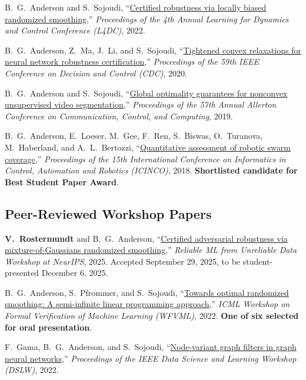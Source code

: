 \begin{enumerate}[label={[\arabic*]}]
	\item B.\ G.\ Anderson and S.\ Sojoudi, ``\href{https://brendon-anderson.github.io/files/publications/anderson2022certified-long.pdf}{Certified robustness via locally biased randomized smoothing},'' \textit{Proceedings of the 4th Annual Learning for Dynamics and Control Conference (L4DC)}, 2022.
	\item B.\ G.\ Anderson, Z.\ Ma, J.\ Li, and S.\ Sojoudi, ``\href{https://arxiv.org/pdf/2004.00570.pdf}{Tightened convex relaxations for neural network robustness certification},'' \textit{Proceedings of the 59th IEEE Conference on Decision and Control (CDC)}, 2020.
	\item B.\ G.\ Anderson and S.\ Sojoudi, ``\href{https://arxiv.org/pdf/1907.04409.pdf}{Global optimality guarantees for nonconvex unsupervised video segmentation},'' \textit{Proceedings of the 57th Annual Allerton Conference on Communication, Control, and Computing}, 2019.
	\item B.\ G.\ Anderson, E.\ Loeser, M.\ Gee, F.\ Ren, S.\ Biswas, O.\ Turanova, M.\ Haberland, and A.\ L.\ Bertozzi, ``\href{https://arxiv.org/pdf/1806.02488.pdf}{Quantitative assessment of robotic swarm coverage},'' \textit{Proceedings of the 15th International Conference on Informatics in Control, Automation and Robotics (ICINCO)}, 2018. \textbf{Shortlisted candidate for Best Student Paper Award}.
\end{enumerate}

\vspace*{\subsectionskip}

\subsection{Peer-Reviewed Workshop Papers}

\begin{enumerate}[label={[\arabic*]}]
	\item \textbf{V.\ Rostermundt} and B.\ G.\ Anderson, ``\href{https://brendon-anderson.github.io/files/publications/rostermundt2025certified.pdf}{Certified adversarial robustness via mixture-of-{Gaussians} randomized smoothing},'' \textit{Reliable ML from Unreliable Data Workshop at NeurIPS}, 2025. Accepted September 29, 2025, to be student-presented December 6, 2025.
	\item B.\ G.\ Anderson, S.\ Pfrommer, and S.\ Sojoudi, ``\href{https://brendon-anderson.github.io/files/publications/anderson2022towards.pdf}{Towards optimal randomized smoothing: A semi-infinite linear programming approach},'' \textit{ICML Workshop on Formal Verification of Machine Learning (WFVML)}, 2022. \textbf{One of six selected for oral presentation}.
	\item F.\ Gama, B.\ G.\ Anderson, and S.\ Sojoudi, ``\href{https://arxiv.org/pdf/2106.00089.pdf}{Node-variant graph filters in graph neural networks},'' \textit{Proceedings of the IEEE Data Science and Learning Workshop (DSLW)}, 2022.
\end{enumerate}


